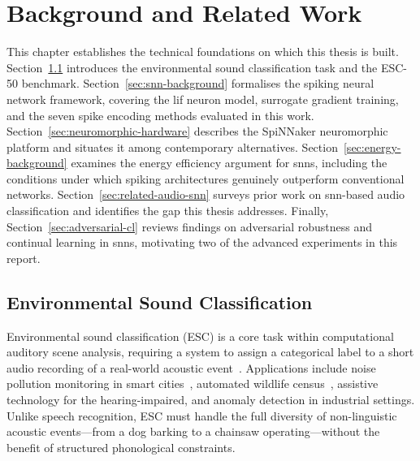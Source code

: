 
\chapter{Background and Related Work}
\label{ch:background}

This chapter establishes the technical foundations on which this thesis is built. Section~\ref{sec:esc} introduces the environmental sound classification task and the ESC-50 benchmark. Section~\ref{sec:snn-background} formalises the spiking neural network framework, covering the \gls{lif} neuron model, surrogate gradient training, and the seven spike encoding methods evaluated in this work. Section~\ref{sec:neuromorphic-hardware} describes the SpiNNaker neuromorphic platform and situates it among contemporary alternatives. Section~\ref{sec:energy-background} examines the energy efficiency argument for \glspl{snn}, including the conditions under which spiking architectures genuinely outperform conventional networks. Section~\ref{sec:related-audio-snn} surveys prior work on \gls{snn}-based audio classification and identifies the gap this thesis addresses. Finally, Section~\ref{sec:adversarial-cl} reviews findings on adversarial robustness and continual learning in \glspl{snn}, motivating two of the advanced experiments in this report.

\section{Environmental Sound Classification}
\label{sec:esc}

Environmental sound classification (ESC) is a core task within computational auditory scene analysis, requiring a system to assign a categorical label to a short audio recording of a real-world acoustic event~\citep{barchiesi2015}. Applications include noise pollution monitoring in smart cities~\citep{bello2019}, automated wildlife census~\citep{stowell2019}, assistive technology for the hearing-impaired, and anomaly detection in industrial settings. Unlike speech recognition, ESC must handle the full diversity of non-linguistic acoustic events---from a dog barking to a chainsaw operating---without the benefit of structured phonological constraints.


